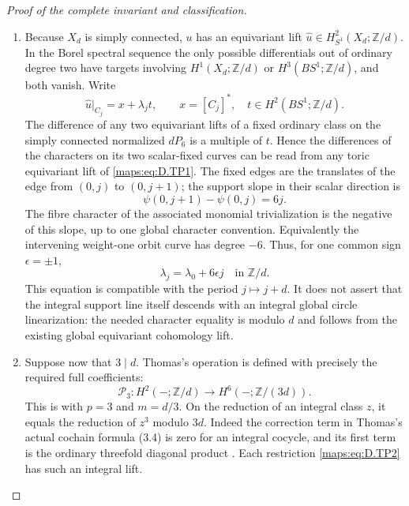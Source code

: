 \begin{proof}[Proof of the complete invariant and classification]
\begin{enumerate}[label=\arabic*.,leftmargin=*]
\item Because $X_d$ is simply connected, $u$ has an equivariant
lift $\widehat u\in H^2_{S^1}(X_d;\mathbb Z/d)$.
In the Borel spectral sequence the only possible
differentials out of ordinary degree two have targets
involving $H^1(X_d;\mathbb Z/d)$ or $H^3(BS^1;\mathbb Z/d)$,
and both vanish. Write
\[
         \widehat u|_{C_j}=x+\lambda_j t,
         \qquad x=[C_j]^*,\quad t\in H^2(BS^1;\mathbb Z/d).
                                                               \tag{D.TP2}\label{maps:eq:D.TP2}
\]
The difference of any two equivariant lifts of a fixed
ordinary class on the simply connected normalized
$dP_6$ is a multiple of $t$. Hence the differences of
the characters on its two scalar-fixed curves can be
read from any toric equivariant lift of \eqref{maps:eq:D.TP1}.
The fixed edges are the translates of the edge from
$(0,j)$ to $(0,j+1)$; the support slope in their scalar
direction is
\[
               \psi(0,j+1)-\psi(0,j)=6j.
                                                               \tag{D.TP3}\label{maps:eq:D.TP3}
\]
The fibre character of the associated monomial
trivialization is the negative of this slope, up to
one global character convention. Equivalently the
intervening weight-one orbit curve has degree $-6$.
Thus, for one common sign $\epsilon=\pm1$,
\[
                    \lambda_j=\lambda_0+6\epsilon j
                                 \quad\text{in }\mathbb Z/d.
                                                               \tag{D.TP4}\label{maps:eq:D.TP4}
\]
This equation is compatible with the period $j\mapsto j+d$.
It does not assert that the integral support line itself
descends with an integral global circle linearization:
the needed character equality is modulo $d$ and follows
from the existing global equivariant cohomology lift.

\item Suppose now that $3\mid d$. Thomas's operation is defined
with precisely the required full coefficients:
\[
 \mathcal P_3:H^2(-;\mathbb Z/d)
                    \longrightarrow H^6(-;\mathbb Z/(3d)).
                                                               \tag{D.TP5}\label{maps:eq:D.TP5}
\]
This is \cite[equation (2.1), p.267]{ffThomas56} with
$p=3$ and $m=d/3$. On the reduction of an integral
class $z$, it equals the reduction of $z^3$ modulo
$3d$. Indeed the correction term in Thomas's actual
cochain formula (3.4) is zero for an integral cocycle,
and its first term is the ordinary threefold diagonal
product \cite[equations (3.4)--(3.6), p.268]{ffThomas56}.
Each restriction \eqref{maps:eq:D.TP2} has such an integral lift.


\end{enumerate}
\end{proof}
